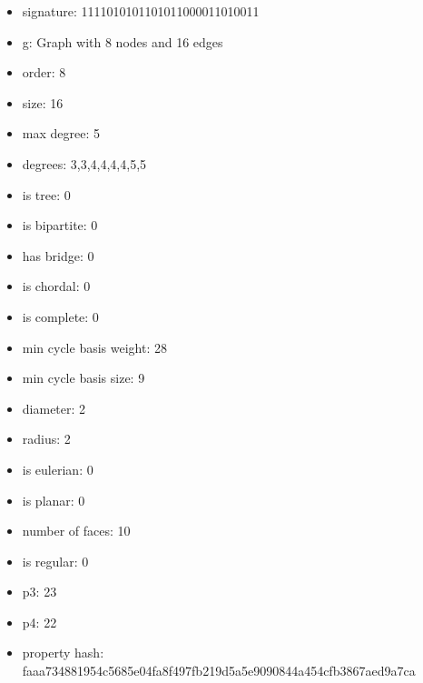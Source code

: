 \begin{itemize}
\item signature: 1111010101101011000011010011
\item g: Graph with 8 nodes and 16 edges
\item order: 8
\item size: 16
\item max degree: 5
\item degrees: 3,3,4,4,4,4,5,5
\item is tree: 0
\item is bipartite: 0
\item has bridge: 0
\item is chordal: 0
\item is complete: 0
\item min cycle basis weight: 28
\item min cycle basis size: 9
\item diameter: 2
\item radius: 2
\item is eulerian: 0
\item is planar: 0
\item number of faces: 10
\item is regular: 0
\item p3: 23
\item p4: 22
\item property hash: faaa734881954c5685e04fa8f497fb219d5a5e9090844a454cfb3867aed9a7ca
\end{itemize}
\newpage
\begin{figure}
\end{figure}
